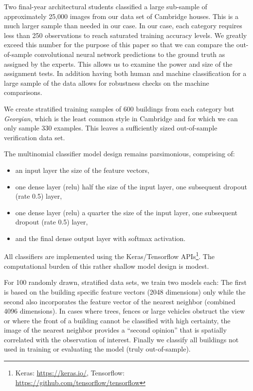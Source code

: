 \documentclass[]{article}
\let\rmarkdownfootnote\footnote%
\def\footnote{\protect\rmarkdownfootnote}
\begin{document}
Two final-year architectural students classified a large sub-sample of
approximately 25,000 images from our data set of Cambridge houses. This
is a much larger sample than needed in our case. In our case, each
category requires less than 250 observations to reach saturated training
accuracy levels. We greatly exceed this number for the purpose of this
paper so that we can compare the out-of-sample convolutional neural
network predictions to the ground truth as assigned by the experts. This
allows us to examine the power and size of the assignment tests. In
addition having both human and machine classification for a large sample
of the data allows for robustness checks on the machine comparisons.

We create stratified training samples of 600 buildings from each
category but \emph{Georgian}, which is the least common style in
Cambridge and for which we can only sample 330 examples. This leaves a
sufficiently sized out-of-sample verification data set.

The multinomial classifier model design remains parsimonious, comprising
of:

\begin{itemize}
\item
  an input layer the size of the feature vectors,
\item
  one dense layer (relu) half the size of the input layer, one
  subsequent dropout (rate 0.5) layer,
\item
  one dense layer (relu) a quarter the size of the input layer, one
  subsequent dropout (rate 0.5) layer,
\item
  and the final dense output layer with softmax activation.
\end{itemize}

All classifiers are implemented using the Keras/Tensorflow
APIs\footnote{Keras: \href{https://keras.io/}{https://keras.io/}, Tensorflow: \href{https://github.com/tensorflow/tensorflow}{https://github.com/tensorflow/tensorflow}}.
The computational burden of this rather shallow model design is modest.

For 100 randomly drawn, stratified data sets, we train two models each:
The first is based on the building specific feature vectors (2048
dimensions) only while the second also incorporates the feature vector
of the nearest neighbor (combined 4096 dimensions). In cases where
trees, fences or large vehicles obstruct the view or where the front of
a building cannot be classified with high certainty, the image of the
nearest neighbor provides a ``second opinion'' that is spatially
correlated with the observation of interest. Finally we classify all
buildings not used in training or evaluating the model (truly
out-of-sample).
\end{document}
